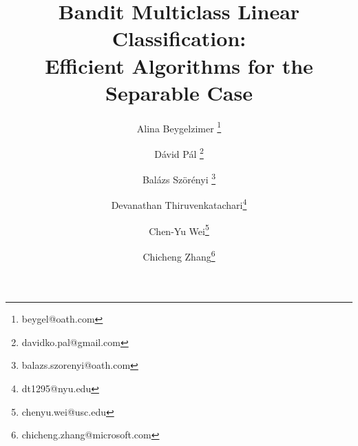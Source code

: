 

\title{Bandit Multiclass Linear Classification: \\ Efficient Algorithms for the Separable Case}

\author[1]{Alina Beygelzimer \thanks{beygel@oath.com}}
\author[1]{D\'avid P\'al \thanks{davidko.pal@gmail.com}}
\author[1]{Bal\'azs Sz\"or\'enyi \thanks{balazs.szorenyi@oath.com}}
\author[2]{Devanathan Thiruvenkatachari\thanks{dt1295@nyu.edu}}
\author[3]{Chen-Yu Wei\thanks{chenyu.wei@usc.edu}}
\author[4]{Chicheng Zhang\thanks{chicheng.zhang@microsoft.com}}



\maketitle




